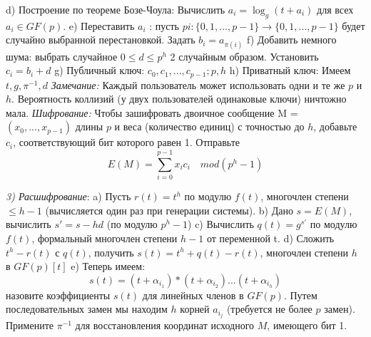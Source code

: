 \documentclass[a4paper,12pt]{article}
\newcommand{\DL}{\newline\newline}
\begin{document}
\indent d) Построение по теореме Бозе-Чоула: Вычислить $a_i= \log_g(t +a_i)$ для всех $a_i \in GF(p)$. \newline
\indent e)  Переставить $a_i$ : пусть $pi: \{ 0, 1, ..., p-1 \} \rightarrow \{ 0, 1, ..., p-1 \}$ будет случайно выбранной перестановкой. Задать $b_i = a_{\pi(i)}$ \newline
\indent f) Добавить немного шума: выбрать случайное $0\leq d \leq p^h$ 2 случайным образом. Установить $c_i = b_i+d$ \newline
\indent g) Публичный ключ: $c_0, c_1, ..., c_{p-1};p,h$ \newline
\indent h) Приватный ключ: Имеем $t,g,\pi^{-1}, d$ \newline
\textsl{Замечание:} Каждый пользователь может использовать одни и те же $p$ и $h$. Вероятность коллизий (у двух пользователей одинаковые ключи) ничтожно мала. \newline
\indent \textsl{Шифрование: } \newline Чтобы зашифровать двоичное сообщение M = $(x_0,...,x_{p-1})$ длины $p$ и веса (количество единиц) с точностью до $h$, добавьте $c_i$, соответствующий бит которого равен 1. Отправьте
$$E(M) = \sum_{i=0}^{p-1}x_i c_i \quad mod(p^h -1)$$

\textsl{3) Расшифрование}: \newline
\indent a) Пусть $r(t)= t^h$ по модулю $f(t)$, многочлен степени $\leq h - 1$ (вычисляется один раз при генерации системы). \newline
\indent b) Дано $s = E(M)$, вычислить $s' = s-hd$ (по модулю $p^h - 1$) \newline
\indent c) Вычислить $q(t) = g^{s'}$ по модулю $f(t)$, формальный многочлен степени $h -1$ от переменной t. \newline
\indent d) Сложить $t^h - r(t)$ с $q(t)$, получить $s(t) = t^h + q(t) - r(t)$, многочлен степени $h$ в $GF(p)[t]$ \newline
\indent e) Теперь имеем: 
$$s(t) = (t+ \alpha_{i_1}) * (t+ \alpha_{i_2}) ... (t+ \alpha_{i_h})$$
назовите коэффициенты $s(t)$ для линейных членов в $GF(p)$. Путем последовательных замен мы находим $h$ корней $a_{i_j}$ (требуется не более $p$ замен). Примените $\pi^{-1} $ для восстановления координат исходного $M$, имеющего бит 1.\DL
\end{document}
